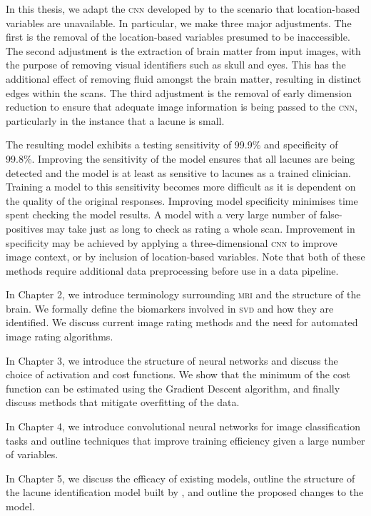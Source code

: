 In this thesis, we adapt the \textsc{cnn} developed by \cite{GhafoorianM.2017Dml3} to the scenario that location-based variables are unavailable. In particular, we make three major adjustments. The first is the removal of the location-based variables presumed to be inaccessible. The second adjustment is the extraction of brain matter from input images, with the purpose of removing visual identifiers such as skull and eyes. This has the additional effect of removing fluid amongst the brain matter, resulting in distinct edges within the scans. The third adjustment is the removal of early dimension reduction to ensure that adequate image information is being passed to the \textsc{cnn}, particularly in the instance that a lacune is small.

The resulting model exhibits a testing sensitivity of 99.9\% and specificity of 99.8\%. Improving the sensitivity of the model ensures that all lacunes are being detected and the model is at least as sensitive to lacunes as a trained clinician. Training a model to this sensitivity becomes more difficult as it is dependent on the quality of the original responses. Improving model specificity minimises time spent checking the model results. A model with a very large number of false-positives may take just as long to check as rating a whole scan. Improvement in specificity may be achieved by applying a three-dimensional \textsc{cnn} to improve image context, or by inclusion of location-based variables. Note that both of these methods require additional data preprocessing before use in a data pipeline.

In Chapter 2, we introduce terminology surrounding \textsc{mri} and the structure of the brain. We formally define the biomarkers involved in \textsc{svd} and how they are identified. We discuss current image rating methods and the need for automated image rating algorithms.

In Chapter 3, we introduce the structure of neural networks and discuss the choice of activation and cost functions. We show that the minimum of the cost function can be estimated using the Gradient Descent algorithm, and finally discuss methods that mitigate overfitting of the data.

In Chapter 4, we introduce convolutional neural networks for image classification tasks and outline techniques that improve training efficiency given a large number of variables.

In Chapter 5, we discuss the efficacy of existing models, outline the structure of the lacune identification model built by \cite{GhafoorianM.2017Dml3}, and outline the proposed changes to the model.

